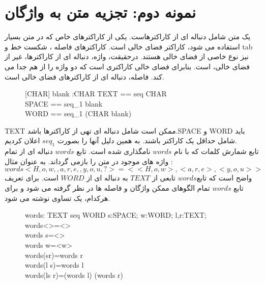 \section{نمونه دوم: تجزیه متن به واژگان}
یک متن شامل دنباله ای از کاراکترهاست. یکی از کاراکترهای خاص که در متن بسیار استفاده می شود، کاراکتر فضای خالی 
است. کاراکترهای فاصله
، شکست خط
و tab نیز نوع خاصی از فضای خالی هستند. درحقیقت، واژه، دنباله ای از کاراکترها، غیر از فضای خالی، است. بنابرای فضای خالی کاراکتری است که دو واژه را از هم جدا می کند. فاصله، دنباله ای از کاراکترهای فضای خالی است. 
\begin{figure}
\centering
\begin{schema}{[CHAR]}
blank :CHAR
\ST
TEXT == seq \enspace CHAR\\
SPACE == seq_1 \enspace blank\\
WORD == seq_1 \enspace (CHAR \setminus blank)
\end{schema}
\caption{}
\label{CHAR}
\end{figure}
TEXT ممکن است شامل دنباله ای تهی از کاراکترها باشد.SPACE و WORD باید شامل حداقل یک کاراکتر باشند. به همین دلیل آنها را بصورت $seq_1$ اعلان کردیم. 
\\
تابع شمارش کلمات که با نام $words$ نامگذاری شده است. تابع $words$ دنباله ای از تمام واژه های موجود در متن را بازمی گرداند. به عنوان مثال :
\\
$
words <H,o,w, ,a,r,e, ,y,o,u,?>=<<H,o,w>,<a,r,e>,<y,o,u>>
$
\\
واضح است که تابع$words$ تابعی از 
$TEXT$
 به دنباله ای از 
 $WORD$
  است. برای تعریف تابع $words$ تمام الگوهای ممکن واژگان و فاصله ها در نظر گرفته می شود و برای هرکدام، یک تساوی نوشته می شود.
\begin{figure}
\centering
\begin{axdef}
words: TEXT \rightarrow seq \enspace WORD
\ST
\forall s:SPACE; \enspace w:WORD; \enspace l,r:TEXT;\\
words<>=<>\wedge\\
words \enspace s=<> \wedge \\
words \enspace w=<w>\wedge \\
words(s\frown r)=words \enspace r\wedge \\
words(l \frown s)=words \enspace l\wedge \\
words(l\frown s \frown r)=(words \enspace l) \frown (words \enspace r)
\end{axdef}
\caption{}
\label{fig1}
\end{figure}
